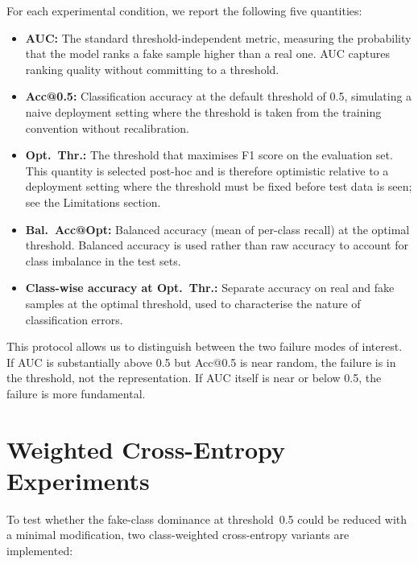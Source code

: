 \documentclass[a4paper,12pt]{report}
\begin{document}
For each experimental condition, we report the following
five quantities:

\begin{itemize}
  \item \textbf{AUC:} The standard threshold-independent
        metric, measuring the probability that the model
        ranks a fake sample higher than a real one.
        AUC captures ranking quality without committing
        to a threshold.

  \item \textbf{Acc@0.5:} Classification accuracy at the
        default threshold of 0.5, simulating a naive
        deployment setting where the threshold is taken
        from the training convention without recalibration.

  \item \textbf{Opt.~Thr.:} The threshold that maximises
        F1 score on the evaluation set.
        This quantity is selected post-hoc and is therefore
        optimistic relative to a deployment setting where
        the threshold must be fixed before test data is
        seen; see the Limitations section.

  \item \textbf{Bal.~Acc@Opt:} Balanced accuracy
        (mean of per-class recall) at the optimal
        threshold.
        Balanced accuracy is used rather than raw accuracy
        to account for class imbalance in the test sets.

  \item \textbf{Class-wise accuracy at Opt.~Thr.:}
        Separate accuracy on real and fake samples at
        the optimal threshold, used to characterise
        the nature of classification errors.
\end{itemize}

This protocol allows us to distinguish between the two
failure modes of interest.
If AUC is substantially above 0.5 but Acc@0.5 is near
random, the failure is in the threshold, not the
representation.
If AUC itself is near or below 0.5, the failure is more
fundamental.

\section{Weighted Cross-Entropy Experiments}

To test whether the fake-class dominance at threshold~0.5
could be reduced with a minimal modification, two
class-weighted cross-entropy variants are implemented:
\end{document}
